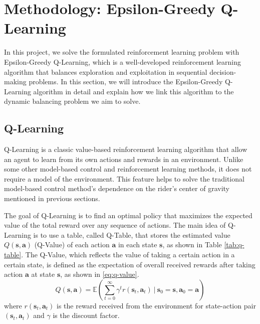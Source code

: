\documentclass[10pt,a4paper]{article}
\begin{document}
\section{Methodology: Epsilon-Greedy Q-Learning}
In this project, we solve the formulated reinforcement learning problem with Epsilon-Greedy Q-Learning, which is a well-developed reinforcement learning algorithm that balances exploration and exploitation in sequential decision-making problems. In this section, we will introduce the Epsilon-Greedy Q-Learning algorithm in detail and explain how we link this algorithm to the dynamic balancing problem we aim to solve. 

\subsection{Q-Learning}
Q-Learning is a classic value-based reinforcement learning algorithm that allow an agent to learn from its own actions and rewards in an environment. Unlike some other model-based control and reinforcement learning methods, it does not require a model of the environment. This feature helps to solve the traditional model-based control method's dependence on the rider's center of gravity mentioned in previous sections. 

The goal of Q-Learning is to find an optimal policy that maximizes the expected value of the total reward over any sequence of actions. The main idea of Q-Learning is to use a table, called Q-Table, that stores the estimated value $Q(\boldsymbol{s}, \boldsymbol{a})$ (Q-Value) of each action $\boldsymbol{a}$ in each state $\boldsymbol{s}$, as shown in Table \ref{tab:q-table}. The Q-Value, which reflects the value of taking a certain action in a certain state, is defined as the expectation of overall received rewards after taking action $\boldsymbol{a}$ at state $\boldsymbol{s}$, as shown in \eqref{eq:q-value}. 
\begin{equation}
	Q(\boldsymbol{s}, \boldsymbol{a}) = \mathbb{E}\left(\sum_{t = 0}^{\infty} \gamma^{t}r(\boldsymbol{s}_{t}, \boldsymbol{a}_{t}) ~\left|~ \boldsymbol{s}_{0} = \boldsymbol{s}, \boldsymbol{a}_{0} = \boldsymbol{a}\right.\right)
	\label{eq:q-value}
\end{equation}
where $r(\boldsymbol{s}_{t}, \boldsymbol{a}_{t})$ is the reward received from the environment for state-action pair $(\boldsymbol{s}_{t}, \boldsymbol{a}_{t})$ and $\gamma$ is the discount factor. 
\end{document}
